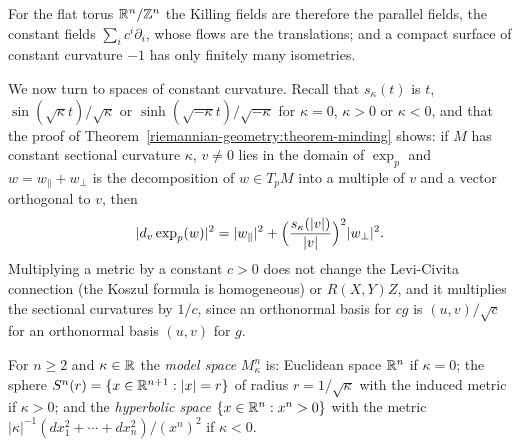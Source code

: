 For the flat torus $\mathbb{R}^n/\mathbb{Z}^n$ the Killing fields are therefore the parallel fields, the constant fields $\sum_ic^i\partial_i$, whose flows are the translations; and a
compact surface of constant curvature $-1$ has only finitely many isometries.

We now turn to spaces of constant curvature. Recall that $s_\kappa(t)$ is $t$, $\sin(\sqrt\kappa t)/\sqrt\kappa$ or $\sinh(\sqrt{-\kappa}t)/\sqrt{-\kappa}$ for
$\kappa = 0$, $\kappa > 0$ or $\kappa < 0$, and that the proof of Theorem~\ref{riemannian-geometry:theorem-minding} shows: if $M$ has constant sectional curvature $\kappa$,
$v \neq 0$ lies in the domain of $\exp_p$ and $w = w_\parallel + w_\perp$ is the decomposition of $w \in T_pM$ into a multiple of $v$ and a vector orthogonal to $v$, then
\begin{equation}\label{riemannian-geometry:equation-exp-constant-curvature}
|d_v\exp_p(w)|^2 = |w_\parallel|^2 + \Bigl(\frac{s_\kappa(|v|)}{|v|}\Bigr)^2|w_\perp|^2.
\end{equation}
Multiplying a metric by a constant $c > 0$ does not change the Levi-Civita connection (the Koszul formula is homogeneous) or $R(X, Y)Z$, and it multiplies the
sectional curvatures by $1/c$, since an orthonormal basis for $cg$ is $(u, v)/\sqrt c$ for an orthonormal basis $(u, v)$ for $g$.

\begin{definition}\label{riemannian-geometry:definition-model-spaces}
For $n \geq 2$ and $\kappa \in \mathbb{R}$ the \emph{model space} $M^n_\kappa$ is: Euclidean space $\mathbb{R}^n$ if $\kappa = 0$; the sphere $S^n(r) = \{x \in \mathbb{R}^{n+1} : |x| = r\}$ of
radius $r = 1/\sqrt\kappa$ with the induced metric if $\kappa > 0$; and the \emph{hyperbolic space} $\{x \in \mathbb{R}^n : x^n > 0\}$ with the metric
$|\kappa|^{-1}(dx_1^2 + \cdots + dx_n^2)/(x^n)^2$ if $\kappa < 0$.
\end{definition}

